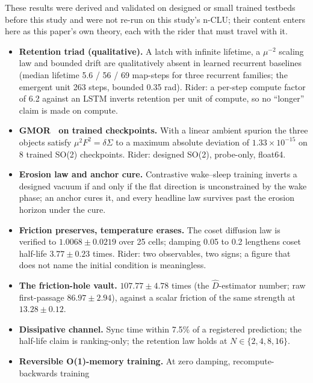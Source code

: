 \documentclass{article} %
\newcommand{\sci}[2]{\ensuremath{#1\times10^{#2}}}
\begin{document}
These results were derived and validated on designed or small trained testbeds before this study
and were not re-run on this study's n-CLU; their content enters here as this paper's own theory,
each with the rider that must travel with it. %
\begin{itemize}[leftmargin=*,itemsep=1pt]
\item \textbf{Retention triad (qualitative).} A latch with infinite lifetime, a $\mu^{-2}$ scaling
law and bounded drift are qualitatively absent in learned recurrent baselines (median lifetime 5.6
  / 56 / 69 map-steps for three recurrent families; the emergent unit 263 steps, bounded 0.35 rad).
  Rider: a per-step compute factor of 6.2 against an LSTM inverts retention per unit of compute, so
  no ``longer'' claim is made on compute. %
\item \textbf{GMOR~\citep{gellmann1968behavior} on trained checkpoints.} With a linear ambient spurion the three objects satisfy
  $\mu^2F^2=\delta\Sigma$ to a maximum absolute deviation of \sci{1.33}{-15} on 8 trained SO(2)
  checkpoints. Rider: designed SO(2), probe-only, float64. %
\item \textbf{Erosion law and anchor cure.} Contrastive wake--sleep training inverts a designed
  vacuum if and only if the flat direction is unconstrained by the wake phase; an anchor cures it,
  and every headline law survives past the erosion horizon under the cure. %
\item \textbf{Friction preserves, temperature erases.} The coset diffusion law is verified to
  $1.0068\pm0.0219$ over 25 cells; damping 0.05 to 0.2 lengthens coset half-life
  $3.77\pm0.23$ times. Rider: two observables, two signs; a figure that does not name the initial
  condition is meaningless. %
\item \textbf{The friction-hole vault.} $107.77\pm4.78$ times (the $\hat D$-estimator number; raw
  first-passage $86.97\pm2.94$), against a scalar friction of the same strength at
  $13.28\pm0.12$. %
\item \textbf{Dissipative channel.} Sync time within 7.5\% of a registered prediction; the half-life
  claim is ranking-only; the retention law holds at $N\in\{2,4,8,16\}$. %
\item \textbf{Reversible O(1)-memory training.} At zero damping, recompute-backwards training

\end{itemize}
\end{document}
